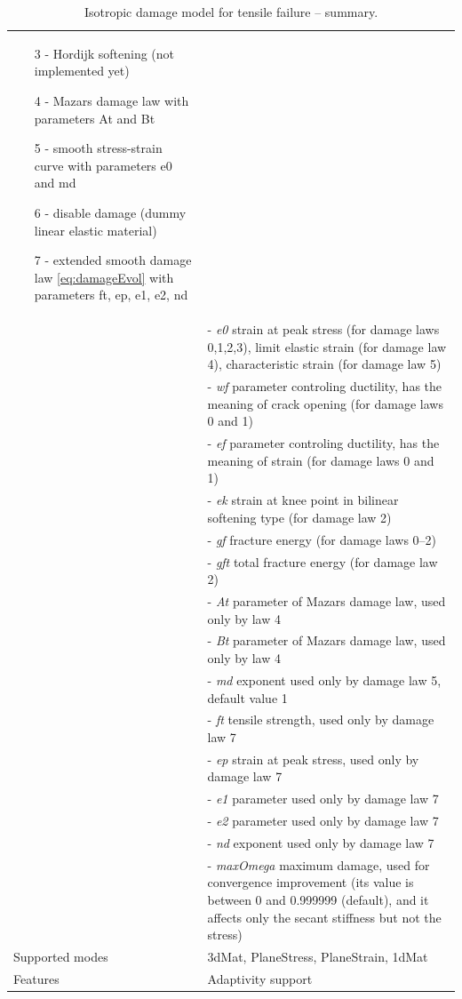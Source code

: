 \documentclass[a4paper]{article}
\newcommand{\param}[1]{{\it #1}}
\begin{document}
\begin{table}[!htb]
\begin{tabular}{|l|p{9cm}|}
\begin{itemize}
\item[3 -] Hordijk softening (not implemented yet)
\item[4 -] Mazars damage law with parameters At and Bt
\item[5 -] smooth stress-strain curve with parameters e0 and md
\item[6 -] disable damage (dummy linear elastic material)
\item[7 -] extended smooth damage law \ref{eq:damageEvol} with parameters ft, ep, e1, e2, nd
\end{itemize}\\
&- \param{e0} strain at peak stress (for damage laws 0,1,2,3), limit elastic strain (for damage law 4), characteristic strain (for damage law 5)\\
&- \param{wf} parameter controling ductility, has the meaning of crack opening (for damage laws 0 and 1)\\
&- \param{ef} parameter controling ductility, has the meaning of strain (for damage laws 0 and 1)\\
&- \param{ek} strain at knee point in bilinear softening type (for damage law 2)\\
&- \param{gf} fracture energy (for damage laws 0--2)\\
&- \param{gft} total fracture energy (for damage law 2)\\
&- \param{At} parameter of Mazars damage law, used only by law 4\\
&- \param{Bt} parameter of Mazars damage law, used only by law 4\\
&- \param{md} exponent used only by damage law 5, default value 1\\
&- \param{ft} tensile strength, used only by damage law 7\\
&- \param{ep} strain at peak stress, used only by damage law 7\\
&- \param{e1} parameter used only by damage law 7\\
&- \param{e2} parameter used only by damage law 7\\
&- \param{nd} exponent used only by damage law 7\\
&- \param{maxOmega} maximum damage, used for convergence improvement
(its value is between 0 and 0.999999 (default), and it affects only the secant stiffness
but not the stress)\\
Supported modes& 3dMat, PlaneStress, PlaneStrain, 1dMat\\
Features & Adaptivity support\\
\hline
\end{tabular}
\caption{Isotropic damage model for tensile failure -- summary.}
\label{id_table}
\end{table}
\end{document}
